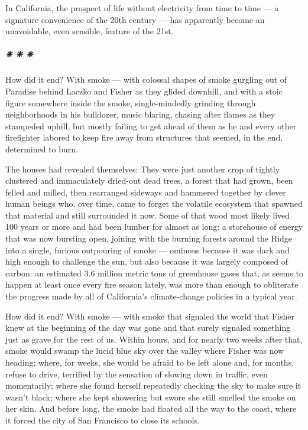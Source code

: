 In California, the prospect of life without electricity from time to
time --- a signature convenience of the 20th century --- has apparently
become an unavoidable, even sensible, feature of the 21st.

\hypertarget{---13}{%
\subparagraph{❈ ❈ ❈}\label{---13}}

How did it end? With smoke --- with colossal shapes of smoke gurgling
out of Paradise behind Laczko and Fisher as they glided downhill, and
with a stoic figure somewhere inside the smoke, single-mindedly grinding
through neighborhoods in his bulldozer, music blaring, chasing after
flames as they stampeded uphill, but mostly failing to get ahead of them
as he and every other firefighter labored to keep fire away from
structures that seemed, in the end, determined to burn.

The houses had revealed themselves: They were just another crop of
tightly clustered and immaculately dried-out dead trees, a forest that
had grown, been felled and milled, then rearranged sideways and hammered
together by clever human beings who, over time, came to forget the
volatile ecosystem that spawned that material and still surrounded it
now. Some of that wood most likely lived 100 years or more and had been
lumber for almost as long: a storehouse of energy that was now bursting
open, joining with the burning forests around the Ridge into a single,
furious outpouring of smoke --- ominous because it was dark and high
enough to challenge the sun, but also because it was largely composed of
carbon: an estimated 3.6 million metric tons of greenhouse gases that,
as seems to happen at least once every fire season lately, was more than
enough to obliterate the progress made by all of California's
climate-change policies in a typical year.

How did it end? With smoke --- with smoke that signaled the world that
Fisher knew at the beginning of the day was gone and that surely
signaled something just as grave for the rest of us. Within hours, and
for nearly two weeks after that, smoke would swamp the lucid blue sky
over the valley where Fisher was now heading; where, for weeks, she
would be afraid to be left alone and, for months, refuse to drive,
terrified by the sensation of slowing down in traffic, even momentarily;
where she found herself repeatedly checking the sky to make sure it
wasn't black; where she kept showering but swore she still smelled the
smoke on her skin. And before long, the smoke had floated all the way to
the coast, where it forced the city of San Francisco to close its
schools.

